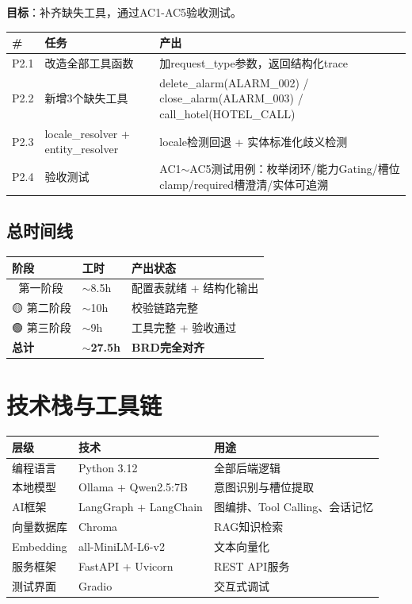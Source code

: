 \documentclass[12pt,a4paper]{ctexart}
\begin{document}
\textbf{目标}：补齐缺失工具，通过AC1-AC5验收测试。

\begin{table}[h]
\centering
\begin{tabular}{@{}llp{6cm}@{}}
\toprule
\textbf{\#} & \textbf{任务} & \textbf{产出} \\
\midrule
P2.1 & 改造全部工具函数 & 加request\_type参数，返回结构化trace \\
P2.2 & 新增3个缺失工具 & delete\_alarm(ALARM\_002) / close\_alarm(ALARM\_003) / call\_hotel(HOTEL\_CALL) \\
P2.3 & locale\_resolver + entity\_resolver & locale检测回退 + 实体标准化歧义检测 \\
P2.4 & 验收测试 & AC1$\sim$AC5测试用例：枚举闭环/能力Gating/槽位clamp/required槽澄清/实体可追溯 \\
\bottomrule
\end{tabular}
\end{table}

\subsection{总时间线}

\begin{center}
\begin{tabular}{@{}lll@{}}
\toprule
\textbf{阶段} & \textbf{工时} & \textbf{产出状态} \\
\midrule
🔴 第一阶段 & $\sim$8.5h & 配置表就绪 + 结构化输出 \\
🟡 第二阶段 & $\sim$10h & 校验链路完整 \\
🟢 第三阶段 & $\sim$9h & 工具完整 + 验收通过 \\
\midrule
\textbf{总计} & \textbf{$\sim$27.5h} & \textbf{BRD完全对齐} \\
\bottomrule
\end{tabular}
\end{center}

\newpage

\section{技术栈与工具链}

\begin{table}[h]
\centering
\begin{tabular}{@{}lll@{}}
\toprule
\textbf{层级} & \textbf{技术} & \textbf{用途} \\
\midrule
编程语言 & Python 3.12 & 全部后端逻辑 \\
本地模型 & Ollama + Qwen2.5:7B & 意图识别与槽位提取 \\
AI框架 & LangGraph + LangChain & 图编排、Tool Calling、会话记忆 \\
向量数据库 & Chroma & RAG知识检索 \\
Embedding & all-MiniLM-L6-v2 & 文本向量化 \\
服务框架 & FastAPI + Uvicorn & REST API服务 \\
测试界面 & Gradio & 交互式调试 \\
\bottomrule
\end{tabular}
\end{table}
\end{document}
